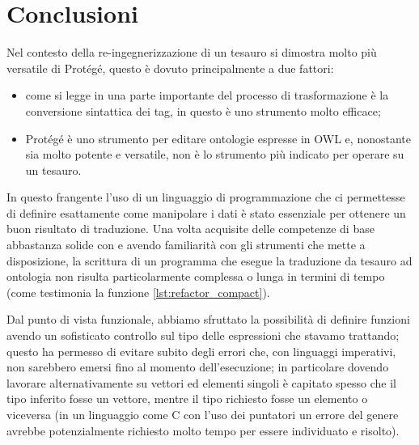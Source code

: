 \section{Conclusioni}
Nel contesto della re-ingegnerizzazione di un tesauro \cduce si dimostra molto più versatile di Protégé, questo è dovuto principalmente a due fattori:
\begin{itemize}
	\item come si legge in \cite{re_engineeringThesaurus} una parte importante del processo di trasformazione è la conversione sintattica dei tag, in questo \cduce è uno strumento molto efficace;
	\item Protégé è uno strumento per editare ontologie espresse in OWL \cite{protege_doc} e, nonostante sia molto potente e versatile, non è lo strumento più indicato per operare su un tesauro.
\end{itemize}
In questo frangente l'uso di un linguaggio di programmazione che ci permettesse di definire esattamente come manipolare i dati è stato essenziale per ottenere un buon risultato di traduzione. Una volta acquisite delle competenze di base abbastanza solide con \cduce e avendo familiarità con gli strumenti che mette a disposizione, la scrittura di un programma che esegue la traduzione da tesauro ad ontologia non risulta particolarmente complessa o lunga in termini di tempo (come testimonia la funzione \ref{lst:refactor_compact}).

Dal punto di vista funzionale, abbiamo sfruttato la possibilità di definire funzioni avendo un sofisticato controllo sul tipo delle espressioni che stavamo trattando; questo ha permesso di evitare subito degli errori che, con linguaggi imperativi, non sarebbero emersi fino al momento dell'esecuzione; in particolare dovendo lavorare alternativamente su vettori ed elementi singoli è capitato spesso che il tipo inferito fosse un vettore, mentre il tipo richiesto fosse un elemento o viceversa (in un linguaggio come C con l'uso dei puntatori un errore del genere avrebbe potenzialmente richiesto molto tempo per essere individuato e risolto).